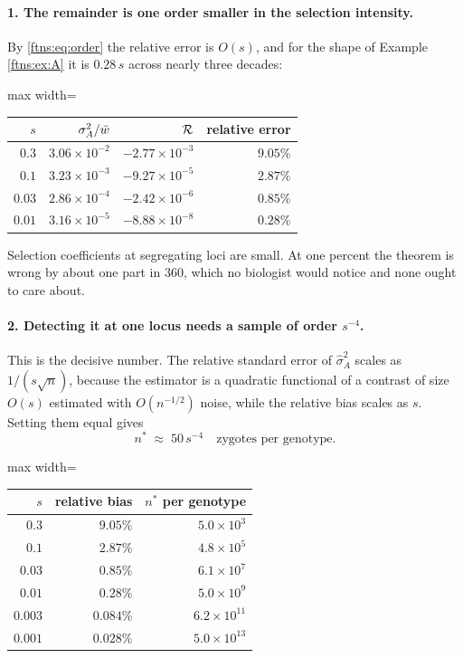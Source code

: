 \paragraph{1. The remainder is one order smaller in the selection intensity.}
By \eqref{ftns:eq:order} the relative error is $O(s)$, and for the shape of Example \ref{ftns:ex:A} it is
$0.28\,s$ across nearly three decades:

\begin{center}
\begin{adjustbox}{max width=\textwidth}
\begin{tabular}{rrrr}
\toprule
$s$ & $\sigma^{2}_{A}/\bar{w}$ & $\mathcal{R}$ & relative error \\
\midrule
$0.3$   & $3.06\times10^{-2}$ & $-2.77\times10^{-3}$ & $9.05\%$ \\
$0.1$   & $3.23\times10^{-3}$ & $-9.27\times10^{-5}$ & $2.87\%$ \\
$0.03$  & $2.86\times10^{-4}$ & $-2.42\times10^{-6}$ & $0.85\%$ \\
$0.01$  & $3.16\times10^{-5}$ & $-8.88\times10^{-8}$ & $0.28\%$ \\
\bottomrule
\end{tabular}
\end{adjustbox}
\end{center}

Selection coefficients at segregating loci are small. At one percent the theorem is wrong by about
one part in $360$, which no biologist would notice and none ought to care about.

\paragraph{2. Detecting it at one locus needs a sample of order $s^{-4}$.}
This is the decisive number. The relative standard error of $\hat\sigma^2_A$ scales as
$1/(s\sqrt n)$, because the estimator is a quadratic functional of a contrast of size $O(s)$
estimated with $O(n^{-1/2})$ noise, while the relative bias scales as $s$. Setting them equal gives
\begin{equation}
n^\ast\;\approx\;50\,s^{-4} \quad\text{zygotes per genotype.}
\label{ftns:eq:nstar}
\end{equation}

\begin{center}
\begin{adjustbox}{max width=\textwidth}
\begin{tabular}{rrr}
\toprule
$s$ & relative bias & $n^\ast$ per genotype \\
\midrule
$0.3$   & $9.05\%$   & $5.0\times10^{3}$ \\
$0.1$   & $2.87\%$   & $4.8\times10^{5}$ \\
$0.03$  & $0.85\%$   & $6.1\times10^{7}$ \\
$0.01$  & $0.28\%$   & $5.0\times10^{9}$ \\
$0.003$ & $0.084\%$  & $6.2\times10^{11}$ \\
$0.001$ & $0.028\%$  & $5.0\times10^{13}$ \\
\bottomrule
\end{tabular}
\end{adjustbox}
\end{center}

